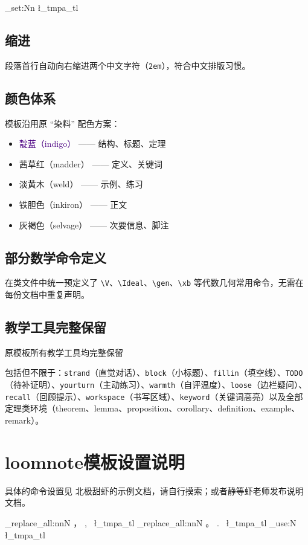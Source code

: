 \documentclass[cjk]{loomnote}
\newcommand{\enpunct}[1]{%
  \tl_set:Nn \l_tmpa_tl {#1}
  \regex_replace_all:nnN {，} {,\ } \l_tmpa_tl %
  \regex_replace_all:nnN {。} {.\ } \l_tmpa_tl %
  \tl_use:N \l_tmpa_tl
}
\begin{document}
\enpunct{

\subsection{缩进}

段落首行自动向右缩进两个中文字符（\texttt{2em}），符合中文排版习惯。

\subsection{颜色体系}

模板沿用原 “染料” 配色方案：
\begin{itemize}
  \item \textcolor{indigo}{靛蓝（indigo）} —— 结构、标题、定理
  \item \textcolor{madder}{茜草红（madder）} —— 定义、关键词
  \item \textcolor{weld}{淡黄木（weld）} —— 示例、练习
  \item \textcolor{inkiron}{铁胆色（inkiron）} —— 正文
  \item \textcolor{selvage}{灰褐色（selvage）} —— 次要信息、脚注
\end{itemize}

\subsection{部分数学命令定义}

在类文件中统一预定义了 \texttt{\textbackslash V}、\texttt{\textbackslash Ideal}、\texttt{\textbackslash gen}、\texttt{\textbackslash xb} 等代数几何常用命令，无需在每份文档中重复声明。

\subsection{教学工具完整保留} \textcolor{selvage}{原模板所有教学工具均完整保留}

包括但不限于：\texttt{strand}（直觉对话）、\texttt{block}（小标题）、\texttt{fillin}（填空线）、\texttt{TODO}（待补证明）、\texttt{yourturn}（主动练习）、\texttt{warmth}（自评温度）、\texttt{loose}（边栏疑问）、\texttt{recall}（回顾提示）、\texttt{workspace}（书写区域）、\texttt{keyword}（关键词高亮）以及全部定理类环境（theorem、lemma、proposition、corollary、definition、example、remark）。

\section{loomnote模板设置说明}

具体的命令设置见 \textcolor{madder}{北极甜虾}的示例文档，请自行摸索；或者静等虾老师发布说明文档。

}
\end{document}
